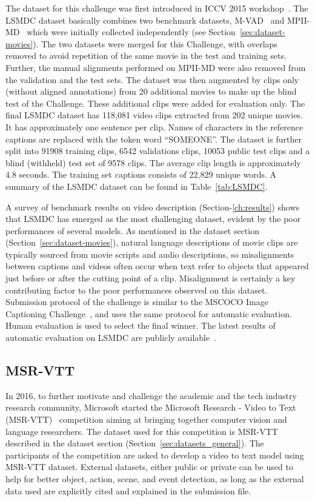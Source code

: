 \documentclass[10pt,journal,compsoc]{IEEEtran}
\begin{document}
The dataset for this challenge was first introduced in ICCV 2015 workshop~\cite{LSMDC2015}. The LSMDC dataset basically combines two benchmark datasets, M-VAD~\cite{torabi2015using} and MPII-MD~\cite{rohrbach2015dataset} which were initially collected independently (see Section~\ref{sec:dataset-movies}). The two datasets were merged for this Challenge, with overlaps removed to avoid repetition of the same movie in the test and training sets. Further, the manual alignments performed on MPII-MD were also removed from the validation and the test sets. The dataset was then augmented by clips only (without aligned annotations) from 20 additional movies to make up the blind test of the Challenge. These additional clips were added for evaluation only. The final LSMDC dataset has 118,081 video clips extracted from 202 unique movies. It has approximately one sentence per clip. Names of characters in the reference captions are replaced with the token word ``SOMEONE''. The dataset is further split into 91908 training clips, 6542 validations clips, 10053 public test clips and a blind (withheld) test set of 9578 clips. The average clip length is approximately 4.8 seconds. The training set captions consists of 22,829 unique words. A summary of the LSMDC dataset can be found in Table~\ref{tab:LSMDC}.

A survey of benchmark results on video description (Section-\ref{ch:results}) shows that  LSMDC has emerged as the most challenging dataset, evident by the poor performances of several models. As mentioned in the dataset section (Section~\ref{sec:dataset-movies}), natural language descriptions of movie clips are typically sourced from movie scripts and audio descriptions, so misalignments between captions and videos often occur when text refer to objects that appeared just before or after the cutting point of a clip. Misalignment is certainly a key contributing factor to the poor performances observed on this dataset. Submission protocol of the challenge is similar to the MSCOCO Image Captioning Challenge~\cite{chen2015microsoft}, and uses the same protocol for automatic evaluation. Human evaluation is used to select the final winner. The latest results of automatic evaluation on LSMDC are publicly available~\cite{LSMDCresults}.
\vspace{-4mm}

\subsection{MSR-VTT}
In 2016, to further motivate and challenge the academic and the tech industry research community, Microsoft started the Microsoft Research - Video to Text (MSR-VTT)~\cite{msrvttchallengehome} competition aiming at bringing together computer vision and language researchers. The dataset used for this competition is MSR-VTT \cite{xu2016msr} described in the dataset section (Section~\ref{sec:datasets_general}). The participants of the competition are asked to develop a video to text model using MSR-VTT dataset. External datasets, either public or private can be used to help for better object, action, scene, and event detection, as long as the external data used are explicitly cited and explained in the submission file. 
\end{document}
